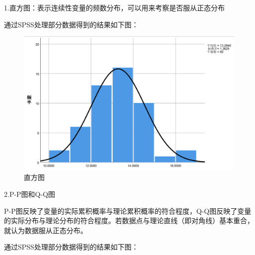 \documentclass[UTF8]{ctexart}
\begin{document}
\begin{itemize}
		1.直方图：表示连续性变量的频数分布，可以用来考察是否服从正态分布
		
		\qquad 通过SPSS处理部分数据得到的结果如下图：
		\begin{figure}[H]
			\centering %
			\includegraphics[scale=0.5]{1_zhifang.jpg}
			\caption{直方图}
		\end{figure}
		2.P-P图和Q-Q图
		
		\qquad P-P图反映了变量的实际累积概率与理论累积概率的符合程度，Q-Q图反映了变量的实际分布与理论分布的符合程度。若数据点与理论直线（即对角线）基本重合，就认为数据服从正态分布。
		
		\qquad 通过SPSS处理部分数据得到的结果如下图：
		

\end{itemize}
\end{document}
